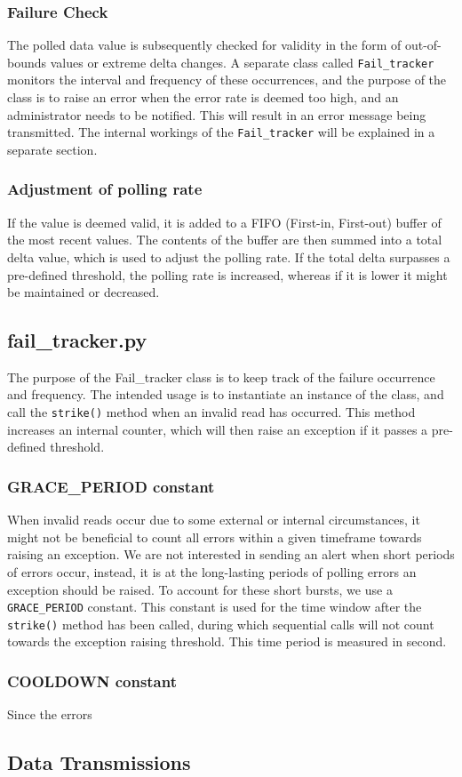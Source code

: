 \subsubsection{Failure Check}
The polled data value is subsequently checked for validity in the form of out-of-bounds values or extreme delta changes. A separate class called \lstinline{Fail_tracker} monitors the interval and frequency of these occurrences, and the purpose of the class is to raise an error when the error rate is deemed too high, and an administrator needs to be notified. This will result in an error message being transmitted. The internal workings of the \lstinline{Fail_tracker} will be explained in a separate section.

\subsubsection{Adjustment of polling rate}
If the value is deemed valid, it is added to a FIFO (First-in, First-out) buffer of the most recent values. The contents of the buffer are then summed into a total delta value, which is used to adjust the polling rate. If the total delta surpasses a pre-defined threshold, the polling rate is increased, whereas if it is lower it might be maintained or decreased.


\subsection{fail\_tracker.py}
The purpose of the Fail\_tracker class is to keep track of the failure occurrence and frequency. The intended usage is to instantiate an instance of the class, and call the \lstinline{strike()} method when an invalid read has occurred. This method increases an internal counter, which will then raise an exception if it passes a pre-defined threshold.

\subsubsection{GRACE\_PERIOD constant}
When invalid reads occur due to some external or internal circumstances, it might not be beneficial to count all errors within a given timeframe towards raising an exception. We are not interested in sending an alert when short periods of errors occur, instead, it is at the long-lasting periods of polling errors an exception should be raised. To account for these short bursts, we use a \lstinline{GRACE_PERIOD} constant. This constant is used for the time window after the \lstinline{strike()} method has been called, during which sequential calls  will not count towards the exception raising threshold. This time period is measured in second.

\subsubsection{COOLDOWN constant}
Since the errors 

\subsection{Data Transmissions}